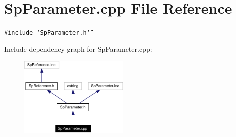 \section{Sp\-Parameter.cpp File Reference}
\label{SpParameter_8cpp}
{\tt \#include \char`\"{}Sp\-Parameter.h\char`\"{}}\par


Include dependency graph for Sp\-Parameter.cpp:\begin{figure}[H]
\begin{center}
\leavevmode
\includegraphics[width=148pt]{SpParameter_8cpp__incl}
\end{center}
\end{figure}
